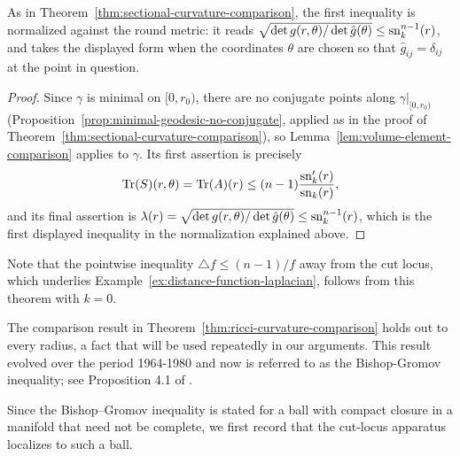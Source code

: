 As in Theorem~\ref{thm:sectional-curvature-comparison}, the first
inequality is normalized against the round metric: it reads
$\sqrt{\det g(r,\theta)/\det\hat g(\theta)}\le\operatorname{sn}_k^{n-1}(r)$, and
takes the displayed form when the coordinates $\theta$ are chosen
so that $\hat g_{ij}=\delta_{ij}$ at the point in question.

\begin{proof}
\sketch
{}
Since $\gamma$ is minimal on $[0,r_0)$, there are no conjugate
points along $\gamma|_{[0,r_0)}$
(Proposition~\ref{prop:minimal-geodesic-no-conjugate}, applied as in
the proof of Theorem~\ref{thm:sectional-curvature-comparison}), so
Lemma~\ref{lem:volume-element-comparison} applies to $\gamma$. Its
first assertion is precisely
$$\operatorname{Tr}(S)(r,\theta)=\operatorname{Tr}(A)(r)\le(n-1)\frac{\operatorname{sn}_k'(r)}{\operatorname{sn}_k(r)},$$
and its final assertion is
$\lambda(r)=\sqrt{\det g(r,\theta)/\det\hat g(\theta)}
\le\operatorname{sn}_k^{n-1}(r)$, which is the first displayed inequality in the
normalization explained above.
\end{proof}

Note that the pointwise inequality $\triangle f\le(n-1)/f$ away
from the cut locus, which underlies
Example~\ref{ex:distance-function-laplacian}, follows from this
theorem with $k=0$.

The comparison result in Theorem~\ref{thm:ricci-curvature-comparison} holds out to
every radius, a fact that will be used repeatedly in our arguments.
This result evolved over the period 1964-1980 and now is referred to
as the Bishop-Gromov inequality; see
Proposition 4.1 of \cite{CheegerGromovTaylor}.

Since the Bishop--Gromov inequality is stated for a ball with
compact closure in a manifold that need not be complete, we first
record that the cut-locus apparatus localizes to such a ball.

